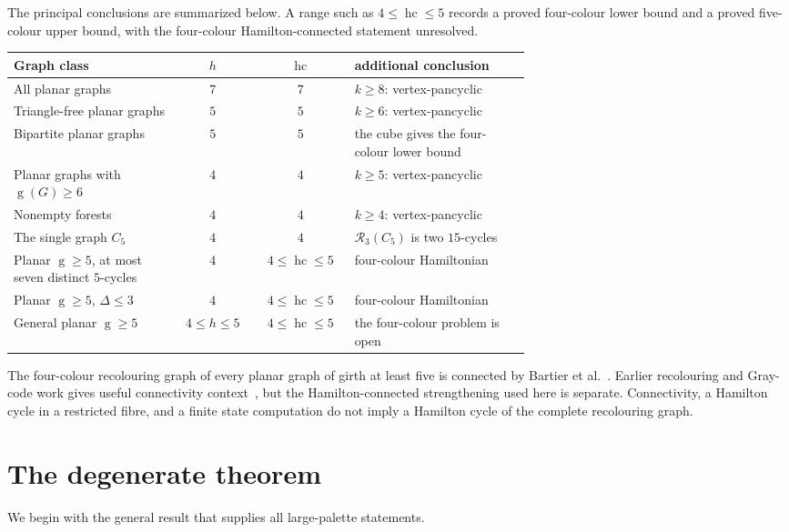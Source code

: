 \documentclass[11pt]{article}
\theoremstyle{remark}
\newcommand{\R}{\mathcal R}
\newcommand{\hc}{\operatorname{hc}}
\newcommand{\girth}{\operatorname{g}}
\numberwithin{equation}{section}
\begin{document}
The principal conclusions are summarized below.  A range such as $4\le\hc\le5$ records a proved four-colour lower bound and a proved five-colour upper bound, with the four-colour Hamilton-connected statement unresolved.

\begin{center}
\renewcommand{\arraystretch}{1.18}
\begin{tabular}{p{0.32\linewidth}c c p{0.34\linewidth}}
\hline
Graph class & $h$ & $\hc$ & additional conclusion\\
\hline
All planar graphs & $7$ & $7$ & $k\ge8$: vertex-pancyclic\\
Triangle-free planar graphs & $5$ & $5$ & $k\ge6$: vertex-pancyclic\\
Bipartite planar graphs & $5$ & $5$ & the cube gives the four-colour lower bound\\
Planar graphs with $\girth(G)\ge6$ & $4$ & $4$ & $k\ge5$: vertex-pancyclic\\
Nonempty forests & $4$ & $4$ & $k\ge4$: vertex-pancyclic\\
The single graph $C_5$ & $4$ & $4$ & $\R_3(C_5)$ is two $15$-cycles\\
Planar $\girth\ge5$, at most seven distinct $5$-cycles & $4$ & $4\le\hc\le5$ & four-colour Hamiltonian\\
Planar $\girth\ge5$, $\Delta\le3$ & $4$ & $4\le\hc\le5$ & four-colour Hamiltonian\\
General planar $\girth\ge5$ & $4\le h\le5$ & $4\le\hc\le5$ & the four-colour problem is open\\
\hline
\end{tabular}
\end{center}

The four-colour recolouring graph of every planar graph of girth at least five is connected by Bartier et al.~\cite{BBFHMP23}.  Earlier recolouring and Gray-code work gives useful connectivity context~\cite{DFFV06,ChMa11}, but the Hamilton-connected strengthening used here is separate.  Connectivity, a Hamilton cycle in a restricted fibre, and a finite state computation do not imply a Hamilton cycle of the complete recolouring graph.

\section{The degenerate theorem}
\label{sec:degenerate}

We begin with the general result that supplies all large-palette statements.
\end{document}
